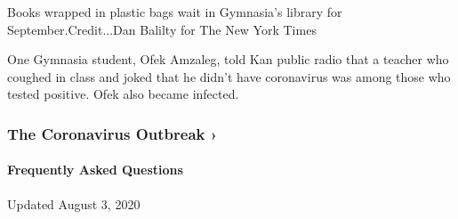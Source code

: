 Books wrapped in plastic bags wait in Gymnasia's library for
September.Credit...Dan Balilty for The New York Times

One Gymnasia student, Ofek Amzaleg, told Kan public radio that a teacher
who coughed in class and joked that he didn't have coronavirus was among
those who tested positive. Ofek also became infected.

\href{https://www.nytimes.com/news-event/coronavirus?action=click\&pgtype=Article\&state=default\&region=MAIN_CONTENT_3\&context=storylines_faq}{}

\hypertarget{the-coronavirus-outbreak-}{%
\subsubsection{The Coronavirus Outbreak
›}\label{the-coronavirus-outbreak-}}

\hypertarget{frequently-asked-questions}{%
\paragraph{Frequently Asked
Questions}\label{frequently-asked-questions}}

Updated August 3, 2020

